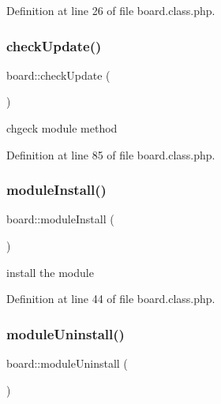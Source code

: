 Definition at line 26 of file board.\+class.\+php.

\mbox{\label{classboard_a64506bb5293024e146d0ff7deeb27684}} 
\subsubsection{\texorpdfstring{check\+Update()}{checkUpdate()}}
{\footnotesize\ttfamily board\+::check\+Update (\begin{DoxyParamCaption}{ }\end{DoxyParamCaption})}



chgeck module method 



Definition at line 85 of file board.\+class.\+php.

\mbox{\label{classboard_abcf015f709c0c2809dba55f74f059ebc}} 
\subsubsection{\texorpdfstring{module\+Install()}{moduleInstall()}}
{\footnotesize\ttfamily board\+::module\+Install (\begin{DoxyParamCaption}{ }\end{DoxyParamCaption})}



install the module 



Definition at line 44 of file board.\+class.\+php.

\mbox{\label{classboard_a1e6008fcf4e2a540370e242246b8e721}} 
\subsubsection{\texorpdfstring{module\+Uninstall()}{moduleUninstall()}}
{\footnotesize\ttfamily board\+::module\+Uninstall (\begin{DoxyParamCaption}{ }\end{DoxyParamCaption})}



